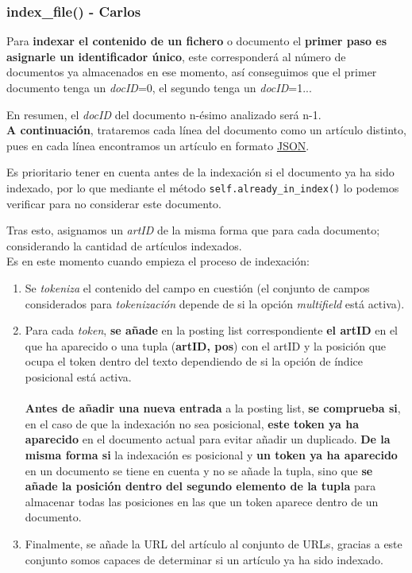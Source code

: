 \documentclass[12pt,a4paper]{article}
\begin{document}
\subsubsection{index\_file() - Carlos}
Para \textbf{indexar el contenido de un fichero} o documento el \textbf{primer paso es asignarle un identificador único}, este corresponderá al número de documentos ya almacenados en ese momento, así conseguimos que el primer documento tenga un \textit{docID}=0, el segundo tenga un \textit{docID}=1... 

En resumen, el \textit{docID} del documento n-ésimo analizado será n-1.\\

\textbf{A continuación}, trataremos cada línea del documento como un artículo distinto, pues en cada línea encontramos un artículo en formato \href{https://en.wikipedia.org/wiki/JSON}{JSON}.

Es prioritario tener en cuenta antes de la indexación si el documento ya ha sido indexado, por lo que mediante el método \texttt{self.already\_in\_index()} lo podemos verificar para no considerar este documento.

Tras esto, asignamos un \textit{artID} de la misma forma que para cada documento; considerando la cantidad de artículos indexados.\\

Es en este momento cuando empieza el proceso de indexación:

\begin{enumerate}
  \item Se \textit{tokeniza} el contenido del campo en cuestión (el conjunto de campos considerados para \textit{tokenización} depende de si la opción \textit{multifield} está activa).
  \item Para cada \textit{token}, \textbf{se añade} en la posting list correspondiente \textbf{el artID} en el que ha aparecido o una tupla (\textbf{artID, pos}) con el artID y la posición que ocupa el token dentro del texto dependiendo de si la opción de índice posicional está activa. \\ \\
  \textbf{Antes de añadir una nueva entrada} a la posting list, \textbf{se comprueba si}, en el caso de que la indexación no sea posicional, \textbf{este token ya ha aparecido} en el documento actual para evitar añadir un duplicado. \textbf{De la misma forma si} la indexación es posicional y \textbf{un token ya ha aparecido} en un documento se tiene en cuenta y no se añade la tupla, sino que \textbf{se añade la posición dentro del segundo elemento de la tupla} para almacenar todas las posiciones en las que un token aparece dentro de un documento.
  \item Finalmente, se añade la URL del artículo al conjunto de URLs, gracias a este conjunto somos capaces de determinar si un artículo ya ha sido indexado.
\end{enumerate}
\end{document}
